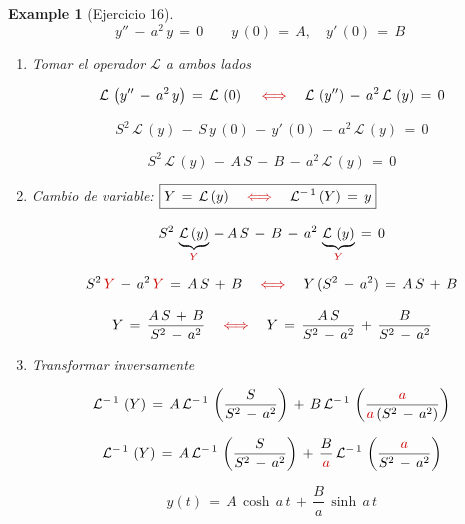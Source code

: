 \documentclass[a4paper,11pt,openany]{book}
\newtheorem{exmp}{Example}[section]
\newcommand*{\itembolasazules}[1]{%
\footnotesize\protect\tikz[baseline=-3pt]%
\protect\node[scale=.7, circle, shade, ball
color=green]{\color{white}\Large\bf#1};}
\begin{document}
\begin{exmp}[Ejercicio 16]

$$y''\,-\,a^{2}\,y\,=\,0 \qquad y\,(0)\,=\,A, \quad y'\,(0)\,=\,B$$
 
\begin{enumerate}[label=\itembolasazules{\arabic*}]
 
 
\item Tomar el operador $\mathcal{L}$ a ambos lados
 
$$\mathcal{L}\,\left(y''\,-\,a^{2}\,y \right)\,=\,\mathcal{L}\,\left(0 \right) \quad \textcolor{bostonuniversityred}{\iff} \quad \mathcal{L}\,\left(y'' \right)\,-\,a^{2}\,\mathcal{L}\,\left(y \right)\,=\,0$$
 
$$S^{2}\,\mathcal{L}\,(y)\,-\,S\,y\,(0)\,-\,y'\,(0)\,-\,a^{2}\,\mathcal{L}\,\left(y \right)\,=\,0 $$
 
$$S^{2}\,\mathcal{L}\,(y)\,-\,A\,S\,-\,B\,-\,a^{2}\,\mathcal{L}\,\left(y \right)\,=\,0 $$
 
\item Cambio de variable: $\boxed{Y\,=\,\mathcal{L}\,(y) \quad \textcolor{bostonuniversityred}{\iff} \quad \mathcal{L}^{-\,1}\,(Y)\,=\,y  }$
 
$$S^{2}\,\underbrace{\mathcal{L}\,(y)}_{\textcolor{bostonuniversityred}{Y}}\,-\,A\,S\,-\,B\,-\,a^{2}\,\underbrace{\mathcal{L}\,\left(y \right)}_{\textcolor{bostonuniversityred}{Y}}\,=\,0 $$
 
$$S^{2}\,\textcolor{bostonuniversityred}{Y}\,-\,a^{2}\,\textcolor{bostonuniversityred}{Y}\,=\,A\,S\,+\,B \quad \textcolor{bostonuniversityred}{\iff} \quad Y\,(S^{2}\,-\,a^{2})\,=\,A\,S\,+\,B$$
 
$$Y\,=\,\dfrac{A\,S\,+\,B}{S^{2}\,-\,a^{2}} \quad \textcolor{bostonuniversityred}{\iff} \quad Y\,=\,\dfrac{A\,S}{S^{2}\,-\,a^{2}}\,+\,\dfrac{B}{S^{2}\,-\,a^{2}}$$
 
\item Transformar inversamente 
 
$$\mathcal{L}^{-\,1}\,\left(Y \right)\,=\,A\,\mathcal{L}^{-\,1}\,\left(\dfrac{S}{S^{2}\,-\,a^{2}} \right)\,+\,B\,\mathcal{L}^{-\,1}\,\left(\dfrac{\textcolor{bostonuniversityred}{a}}{\textcolor{bostonuniversityred}{a}\,(S^{2}\,-\,a^{2})} \right)$$
 
$$\mathcal{L}^{-\,1}\,\left(Y \right)\,=\,A\,\mathcal{L}^{-\,1}\,\left(\dfrac{S}{S^{2}\,-\,a^{2}} \right)\,+\,\dfrac{B}{\textcolor{bostonuniversityred}{a}}\,\mathcal{L}^{-\,1}\,\left(\dfrac{\textcolor{bostonuniversityred}{a}}{S^{2}\,-\,a^{2}} \right)$$
 
$$\boxed{y(t)\,=\,A\,\cosh\,a\,t\,+\,\dfrac{B}{a}\,\sinh\,a\,t}$$
 
\end{enumerate}

\end{exmp}
 
\end{document}
